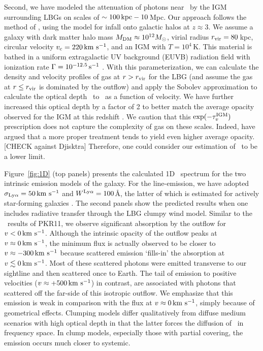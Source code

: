 \documentclass[12pt,preprint]{aastex}
\begin{document}
Second, we have modeled the attenuation of photons near \lya\ by the
IGM surrounding LBGs on scales of $\sim 100\,
{\rm kpc} - 10$\,Mpc.  Our approach follows the method of
\cite{santos04}, using the \cite{barkana04} model for infall onto
galactic halos at $z \approx 3$.  We assume a galaxy with dark matter
halo mass $M_{\rm DM} \approx 10^{12} M_\odot$, virial radius $r_{\rm vir} 
= 80$\,kpc, circular velocity $v_{\rm c} = 220 \, {\rm km~s^{-1}}$, and an
IGM with $T = 10^4$\,K.  This material is bathed in a uniform
extragalactic UV
background (EUVB) radiation field with ionization rate $\Gamma =
10^{-12.5} \, \rm s^{-1}$ \citep{fpl+08}.  With this parameterization,
we can calculate the density and velocity profiles of gas at $r >
r_{\rm vir}$ for the LBG (and assume the gas at $r\le r_{\rm vir}$ is dominated by
the outflow) and apply the Sobolev approximation to calculate the
optical depth \tigm\ to \lya\ as a function of velocity.
We have further increased this optical depth by a factor of 2 to
better match the average opacity observed for the IGM at this redshift
\citep[e.g.][]{faucher08}. 
We caution that
this $\exp(-\tau_v^{\rm IGM})$ prescription does not capture the complexity of
gas on these scales.  Indeed, \cite{zheng10a} have argued that a more
proper treatment tends to yield even higher average opacity.
[CHECK against Djisktra]
Therefore, one could consider our estimation of \tigm\ to be a
lower limit.

Figure~\ref{fig:1D} (top panels) presents the 
calculated 1D \lya\ spectrum for the
two intrinsic emission models of the galaxy.
For the line-emission, we have adopted $\sigma_{\rm Ly\alpha} =
50\, {\rm km~s^{-1}}$ and $W^{\rm Ly\alpha} = 100$\AA, the latter of which is estimated for
actively star-forming galaxies \citep{lya_emit}.
The second panels show the predicted results when one includes
radiative transfer through the LBG clumpy wind model.  Similar to the \mgii\
results of PKR11, we observe significant absorption by the outflow for
$v < 0\, {\rm km~s^{-1}}$.  
Although the intrinsic opacity of the outflow peaks at $v \approx 0 \, {\rm km~s^{-1}}$, the
minimum flux is actually observed to be closer to $v \approx -300
\, {\rm km~s^{-1}}$ because
scattered emission `fills-in' the absorption at $v \lesssim 0
\, {\rm km~s^{-1}}$.  Most of these scattered photons were
emitted transverse to our sightline and then scattered once to
Earth.  The tail of emission to positive velocities ($v
\approx +500\, {\rm km~s^{-1}}$) in contrast, are associated with photons that
scattered off the far-side of this isotropic outflow.  
We emphasize that this emission is weak in comparison with the
flux at $v \approx 0 \, {\rm km~s^{-1}}$, simply because of geometrical effects.
Clumping models differ qualitatively from diffuse medium scenarios
with high optical depth in that the latter forces the diffusion of
\lya\ in frequency space.  In clump models, especially those with
partial covering, the emission occurs much closer to systemic.
\end{document}
